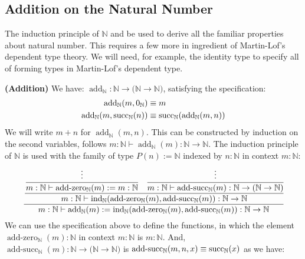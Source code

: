 \subsection{Addition on the Natural Number}

The induction principle of $\mathbb{N}$ and be used to derive all the familiar properties about natural number. This requires a few more in ingredient of Martin-Lof's dependent type theory. We will need, for example, the identity type to specify all of forming types in Martin-Lof's dependent type.

\begin{definition}{\textbf{(Addition)}}
    We have: $\operatorname{add}_\mathbb{N}:\mathbb{N}\rightarrow\big(\mathbb{N}\rightarrow\mathbb{N}\big)$, satisfying the specification:
    \begin{equation*}
    \begin{aligned} 
        \operatorname{add}_\mathbb{N}(m, 0_\mathbb{N}) &\equiv m \\ \operatorname{add}_\mathbb{N}(m, \operatorname{succ}_\mathbb{N}(n)) &\equiv \operatorname{succ}_\mathbb{N}(\operatorname{add}_\mathbb{N}(m,n)) 
    \end{aligned}
    \end{equation*}
    We will write $m+n$ for $\operatorname{add}_\mathbb{N}(m,n)$. This can be constructed by induction on the second variables, follows $m:\mathbb{N}\vdash \operatorname{add}_\mathbb{N}(m):\mathbb{N}\rightarrow\mathbb{N}$. The induction principle of $\mathbb{N}$ is used with the family of type $P(n):=\mathbb{N}$ indexed by $n:\mathbb{N}$ in context $m:\mathbb{N}$:
    \begin{equation*}
    \begin{aligned}
        \cfrac{\cfrac{\cfrac{\vdots}{m:\mathbb{N}\vdash\operatorname{add-zero}_\mathbb{N}(m):=m:\mathbb{N}}\quad\cfrac{\vdots}{m:\mathbb{N}\vdash\operatorname{add-succ}_\mathbb{N}(m):\mathbb{N}\rightarrow(\mathbb{N}\rightarrow\mathbb{N})}}{m:\mathbb{N}\vdash\operatorname{ind}_\mathbb{N}(\operatorname{add-zero}_\mathbb{N}(m), \operatorname{add-succ}_\mathbb{N}(m)):\mathbb{N}\rightarrow\mathbb{N}}}{m:\mathbb{N}\vdash\operatorname{add}_\mathbb{N}(m):=\operatorname{ind}_\mathbb{N}(\operatorname{add-zero}_\mathbb{N}(m),\operatorname{add-succ}_\mathbb{N}(m)):\mathbb{N}\rightarrow\mathbb{N}}
    \end{aligned}
    \end{equation*}
    We can use the specification above to define the functions, in which the element $\operatorname{add-zero}_\mathbb{N}(m):\mathbb{N}$ in context $m:\mathbb{N}$ is $m:\mathbb{N}$. And, $\operatorname{add-succ}_\mathbb{N}(m):\mathbb{N}\rightarrow\big( \mathbb{N}\rightarrow\mathbb{N} \big)$ is $\operatorname{add-succ}_\mathbb{N}(m,n,x)\equiv\operatorname{succ}_\mathbb{N}(x)$ as we have:

\end{definition}
